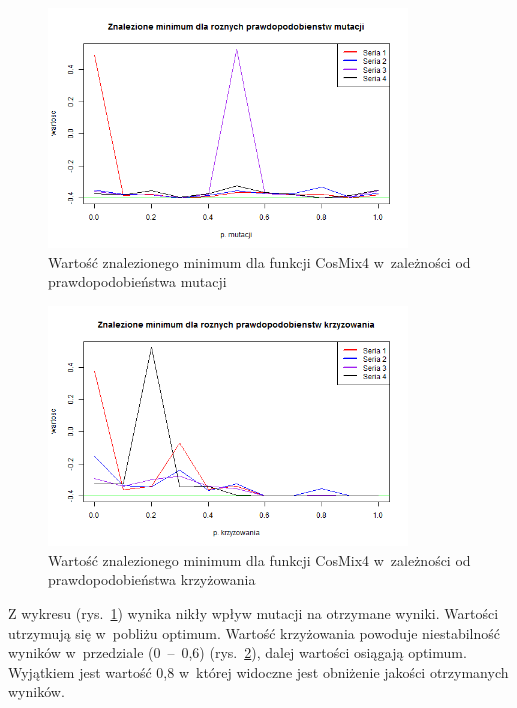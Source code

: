 \documentclass[11pt, a4paper]{article}
\newcommand{\fbi}{\leavevmode{\parindent=1em\indent}}
\begin{document}
\begin{figure}[H]
	\begin{center}
		\includegraphics[width=0.85\textwidth]{./assets/CosMix42.png}
		\caption{Wartość znalezionego minimum dla funkcji CosMix4 w~zależności od prawdopodobieństwa mutacji}
		\label{fig:cosmix42}
	\end{center}
\end{figure}

\begin{figure}[H]
	\begin{center}
		\includegraphics[width=0.85\textwidth]{./assets/CosMix43.png}
		\caption{Wartość znalezionego minimum dla funkcji CosMix4 w~zależności od prawdopodobieństwa krzyżowania}
		\label{fig:cosmix43}
	\end{center}
\end{figure}

\fbi
Z wykresu (rys.~\ref{fig:cosmix42}) wynika nikły wpływ mutacji na otrzymane wyniki. Wartości utrzymują się w~pobliżu optimum. Wartość krzyżowania powoduje niestabilność wyników w~przedziale (0~--~0,6) (rys.~\ref{fig:cosmix43}), dalej wartości osiągają optimum. Wyjątkiem jest wartość 0,8 w~której widoczne jest obniżenie jakości otrzymanych wyników.
\end{document}
